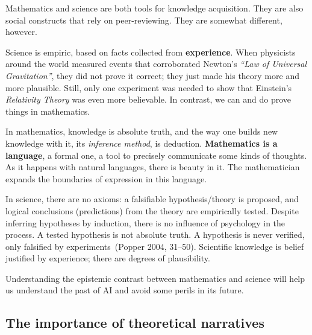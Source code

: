 \documentclass[
  letterpaper,
  12pt,
  british]{tufte-book}
\theoremstyle{plain}
\theoremstyle{plain}
\theoremstyle{definition}
\theoremstyle{remark}
\begin{document}
Mathematics and science are both tools for knowledge acquisition. They
are also social constructs that rely on peer-reviewing. They are
somewhat different, however.

Science is empiric, based on facts collected from \textbf{experience}.
When physicists around the world measured events that corroborated
Newton's \emph{``Law of Universal Gravitation''}, they did not prove it
correct; they just made his theory more and more plausible. Still, only
one experiment was needed to show that Einstein's \emph{Relativity
Theory} was even more believable. In contrast, we can and do prove
things in mathematics.

In mathematics, knowledge is absolute truth, and the way one builds new
knowledge with it, its \emph{inference method}, is deduction.
\textbf{Mathematics is a language}, a formal one, a tool to precisely
communicate some kinds of thoughts. As it happens with natural
languages, there is beauty in it. The mathematician expands the
boundaries of expression in this language.

In science, there are no axioms: a falsifiable hypothesis/theory is
proposed, and logical conclusions (predictions) from the theory are
empirically tested. Despite inferring hypotheses by induction, there is
no influence of psychology in the process. A tested hypothesis is not
absolute truth. A hypothesis is never verified, only falsified by
experiments~(Popper 2004,
31--50).
Scientific knowledge is belief justified by experience; there are
degrees of plausibility.

Understanding the epistemic contrast between mathematics and science
will help us understand the past of {AI} and avoid some perils in its
future.

\hypertarget{the-importance-of-theoretical-narratives}{%
\subsection{The importance of theoretical
narratives}\label{the-importance-of-theoretical-narratives}}
\end{document}
